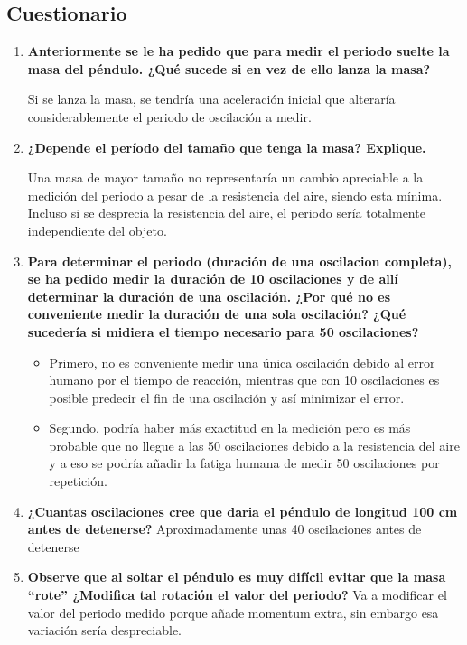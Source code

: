 \subsection{Cuestionario}
\begin{enumerate}
	\item \textbf{Anteriormente se le ha pedido que para medir el periodo suelte la masa del péndulo. ¿Qué sucede si en vez de ello lanza la masa?}

	      Si se lanza la masa, se tendría una aceleración inicial que alteraría considerablemente el periodo de oscilación a medir.
	\item \textbf{¿Depende el per\'iodo del tamaño que tenga la masa? Explique.}


	      Una masa de mayor tamaño no representaría un cambio apreciable a la medición del periodo a pesar de la resistencia del aire, siendo esta mínima. Incluso si se desprecia la resistencia del aire, el periodo sería totalmente independiente del objeto.
	\item \textbf{Para determinar el periodo (duración de una oscilacion completa), se ha pedido medir la duración de 10 oscilaciones y de allí determinar la duración de una oscilación. ¿Por qué no es conveniente medir la duración de una sola oscilación? ¿Qué sucedería si midiera el tiempo necesario para 50 oscilaciones?}
	      \begin{itemize}
		      \item Primero, no es conveniente medir una única oscilación debido al error humano por el tiempo de reacción, mientras que con 10 oscilaciones es posible predecir el fin de una oscilación y así minimizar el error.
		      \item Segundo, podría haber más exactitud en la medición pero es más probable que no llegue a las 50 oscilaciones debido a la resistencia del aire y a eso se podría añadir la fatiga humana de medir 50 oscilaciones por repetición.
	      \end{itemize}

	\item \textbf{¿Cuantas oscilaciones cree que daria el péndulo de longitud 100 cm antes de detenerse?}
	      Aproximadamente unas 40 oscilaciones antes de detenerse
	\item \textbf{Observe que al soltar el p\'endulo es muy dif\'icil evitar que la masa “rote” ¿Modifica tal rotaci\'on el valor del periodo?}
	      Va a modificar el valor del periodo medido porque añade momentum extra, sin embargo esa variación sería despreciable.

\end{enumerate}
